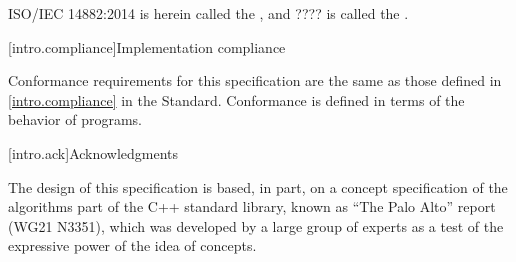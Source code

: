 ISO/IEC 14882:2014 is herein called the , and
???? is called the .

[intro.compliance]{Implementation compliance}

\pnum
Conformance requirements for this specification are the same as those
defined in \ref{intro.compliance} in the \Cpp Standard.
\enternote
Conformance is defined in terms of the behavior of programs.
\exitnote

[intro.ack]{Acknowledgments}

\pnum
The design of this specification is based, in part, on a concept
specification of the algorithms part of the C++ standard library, known
as ``The Palo Alto'' report (WG21 N3351), which was developed by a large
group of experts as a test of the expressive power of the idea of
concepts.

